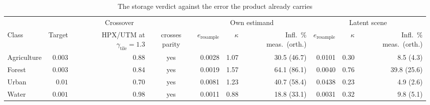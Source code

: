 \begin{table}[t]
\centering
\caption{The storage verdict against the error the product already carries}
\label{tab:alpha_budget}
\footnotesize
\setlength{\tabcolsep}{4pt}
\begin{tabular}{@{}lrrc rrr rrr@{}}
\toprule
 & \multicolumn{3}{c}{Crossover} & \multicolumn{3}{c}{Own estimand} & \multicolumn{3}{c}{Latent scene} \\
\cmidrule(lr){2-4}\cmidrule(lr){5-7}\cmidrule(lr){8-10}
Class & Target & HPX/UTM at $\gamma_{\mathrm{tile}}{=}1.3$ & crosses parity & $e_{\mathrm{resample}}$ & $\kappa$ & Infl.\ \% meas.\ (orth.) & $e_{\mathrm{resample}}$ & $\kappa$ & Infl.\ \% meas.\ (orth.) \\
\midrule
Agriculture & $0.003$ & 0.88 & yes & 0.0028 & 1.07 & 30.5 (46.7) & 0.0101 & 0.30 & 8.5 (4.3) \\
Forest & $0.003$ & 0.84 & yes & 0.0019 & 1.57 & 64.1 (86.1) & 0.0040 & 0.76 & 39.8 (25.6) \\
Urban & $0.01$ & 0.70 & yes & 0.0081 & 1.23 & 40.7 (58.4) & 0.0438 & 0.23 & 4.9 (2.6) \\
Water & $0.001$ & 0.98 & yes & 0.0011 & 0.88 & 18.8 (33.1) & 0.0031 & 0.32 & 9.8 (5.1) \\
\bottomrule
\end{tabular}
\end{table}
